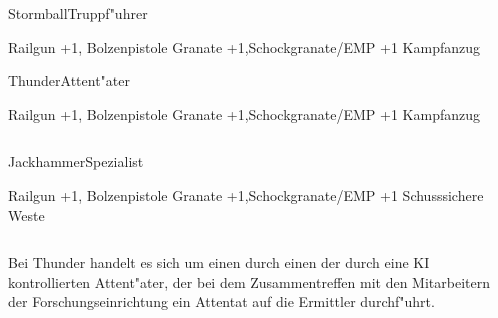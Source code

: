 \begin{column}[l]{0.45}
    \begin{nscsheet}[h]{Stormball\newline{}Truppf"uhrer}
        \nscstats[ATT=3,AGG=3,CON=2]
        \nscruler
        \begin{nscinventory}
            \nscitem[Waffen] Railgun +1, Bolzenpistole
            \nscitem[Granaten] Granate +1,\newline{}Schockgranate/EMP +1
            \nscitem[R"ustung] Kampfanzug
        \end{nscinventory}
    \end{nscsheet}

    \begin{nscsheet}[h]{Thunder\newline{}Attent"ater}
        \nscstats[ATT=3,AGG=3,CON=2]
        \nscruler
        \begin{nscinventory}
            \nscitem[Waffen] Railgun +1, Bolzenpistole
            \nscitem[Granaten] Granate +1,\newline{}Schockgranate/EMP +1
            \nscitem[R"ustung] Kampfanzug
        \end{nscinventory}
    \end{nscsheet}
\end{column}
\begin{column}[r]{0.45}
    \begin{nscsheet}[h]{Jackhammer\newline{}Spezialist}
        \nscstats[ATT=2,AGG=2,DEX=3,CON=2]
        \nscruler
        \begin{nscinventory}
            \nscitem[Waffen] Railgun +1, Bolzenpistole
            \nscitem[Granaten] Granate +1,\newline{}Schockgranate/EMP +1
            \nscitem[R"ustung] Schusssichere Weste
        \end{nscinventory}
    \end{nscsheet}
\end{column}

\medskip
Bei Thunder handelt es sich um einen durch einen der durch eine KI kontrollierten Attent"ater, der bei dem Zusammentreffen mit den 
Mitarbeitern der Forschungseinrichtung ein Attentat auf die Ermittler durchf"uhrt.
